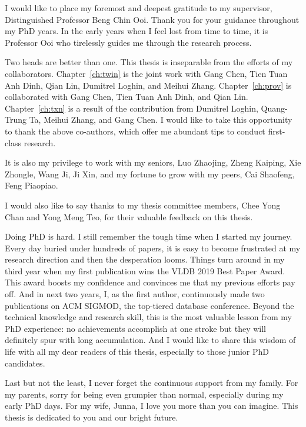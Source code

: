 \begin{acknowledgments}

I would like to place my foremost and deepest gratitude to my supervisor, Distinguished Professor Beng Chin Ooi. 
Thank you for your guidance throughout my PhD years. 
In the early years when I feel lost from time to time, it is Professor Ooi who tirelessly guides me through the research process. 

Two heads are better than one. This thesis is inseparable from the efforts of my collaborators. 
Chapter~\ref{ch:twin} is the joint work with Gang Chen, Tien Tuan Anh Dinh, Qian Lin, Dumitrel Loghin, and Meihui Zhang. 
Chapter~\ref{ch:prov} is collaborated with Gang Chen, Tien Tuan Anh Dinh, and Qian Lin. 
Chapter~\ref{ch:txn} is a result of the contribution from Dumitrel Loghin, Quang-Trung Ta, Meihui Zhang, and Gang Chen.
I would like to take this opportunity to thank the above co-authors, which offer me abundant tips to conduct first-class research. 

It is also my privilege to work with my seniors, Luo Zhaojing, Zheng Kaiping, Xie Zhongle, Wang Ji, Ji Xin, and my fortune to grow with my peers, Cai Shaofeng, Feng Piaopiao. 

I would also like to say thanks to my thesis committee members, Chee Yong Chan and Yong Meng Teo, for their valuable feedback on this thesis. 

Doing PhD is hard. I still remember the tough time when I started my journey. Every day buried under hundreds of papers, it is easy to become frustrated at my research direction and then the desperation looms. 
Things turn around in my third year when my first publication wins the VLDB 2019 Best Paper Award. This award boosts my confidence and convinces me that my previous efforts pay off. 
And in next two years, I, as the first author, continuously made two publications on ACM SIGMOD, the top-tiered database conference.
Beyond the technical knowledge and research skill, this is the most valuable lesson from my PhD experience: no achievements accomplish at one stroke but they will definitely spur with long accumulation.  
And I would like to share this wisdom of life with all my dear readers of this thesis, especially to those junior PhD candidates. 

Last but not the least, I never forget the continuous support from my family. For my parents, sorry for being even grumpier than normal, especially during my early PhD days. For my wife, Junna, I love you more than you can imagine. This thesis is dedicated to you and our bright future. 
    

\end{acknowledgments}
